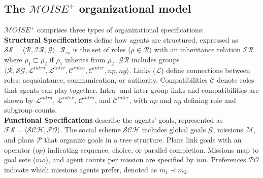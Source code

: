 \documentclass[pdflatex,sn-mathphys-num]{sn-jnl}%
\theoremstyle{thmstyleone}%
\theoremstyle{thmstyletwo}%
\theoremstyle{thmstylethree}%
\begin{document}

\subsection{The $\mathcal{M}OISE^+$ organizational model}

%     

$\mathcal{M}OISE^+$ comprises three types of organizational specifications:\\

\noindent \textbf{Structural Specifications} define how agents are structured, expressed as $\mathcal{SS} = \langle \mathcal{R}, \mathcal{IR}, \mathcal{G} \rangle$. $\mathcal{R}_{ss}$ is the set of roles ($\rho \in \mathcal{R}$) with an inheritance relation $\mathcal{IR}$ where $\rho_1 \sqsubset \rho_2$ if $\rho_1$ inherits from $\rho_2$. $\mathcal{GR}$ includes groups $\langle \mathcal{R}, \mathcal{SG}, \mathcal{L}^{intra}, \mathcal{L}^{inter}, \allowbreak \mathcal{C}^{intra}, \mathcal{C}^{inter}, np, ng \rangle$. Links ($\mathcal{L}$) define connections between roles: acquaintance, communication, or authority. Compatibilities $\mathcal{C}$ denote roles that agents can play together. Intra- and inter-group links and compatibilities are shown by $\mathcal{L}^{intra}$, $\mathcal{L}^{inter}$, $\mathcal{C}^{intra}$, and $\mathcal{C}^{inter}$, with $np$ and $ng$ defining role and subgroup counts.\\

\noindent \textbf{Functional Specifications} describe the agents' goals, represented as $\mathcal{FS} = \langle \mathcal{SCH}, \mathcal{PO} \rangle$. The social scheme $\mathcal{SCH}$ includes global goals $\mathcal{G}$, missions $\mathcal{M}$, and plans $\mathcal{P}$ that organize goals in a tree structure. Plans link goals with an operator ($op$) indicating sequence, choice, or parallel completion. Missions map to goal sets ($mo$), and agent counts per mission are specified by $nm$. Preferences $\mathcal{PO}$ indicate which missions agents prefer, denoted as $m_1 \prec m_2$.\\
\end{document}
